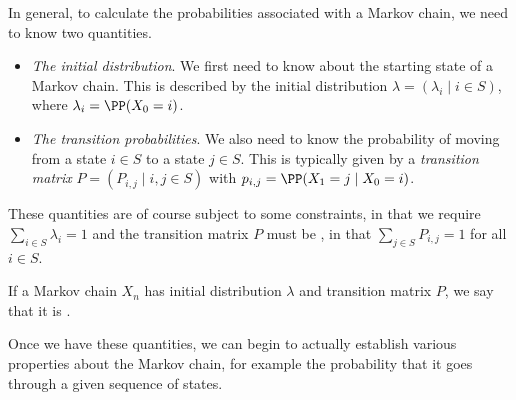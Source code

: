 \documentclass[a4paper]{scrartcl}
\begin{document}
\begin{center}
\end{center}

In general, to calculate the probabilities associated with a Markov chain, we need to know two quantities.

\begin{itemize}
	\item \emph{The initial distribution}. We first need to know about the starting state of a Markov chain. This is described by the initial distribution $\lambda = (\lambda_i \mid i \in S)$, where $\lambda_i = \PP(X_0 = i)$.
	\item \emph{The transition probabilities}. We also need to know the probability of moving from a state $i \in S$ to a state $j \in S$. This is typically given by a \emph{transition matrix} $P = (P_{i, j} \mid i, j \in S)$ with $p_{i,j} = \PP(X_1 = j \mid X_0 = i)$.
\end{itemize}
These quantities are of course subject to some constraints, in that we require $\sum_{i \in S} \lambda_i = 1$ and the transition matrix $P$ must be , in that $\sum_{j \in S} P_{i, j} = 1$ for all $i \in S$.

If a Markov chain $X_n$ has initial distribution $\lambda$ and transition matrix $P$, we say that it is .

Once we have these quantities, we can begin to actually establish various properties about the Markov chain, for example the probability that it goes through a given sequence of states.
\end{document}
